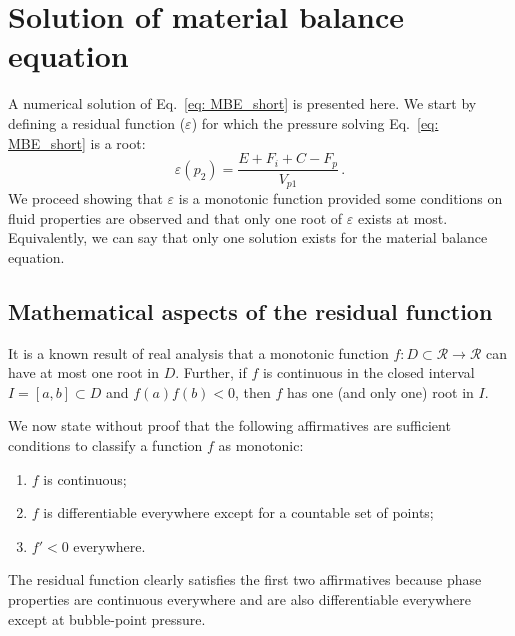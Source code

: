 \documentclass[final,authoryear,5p,twocolumn,10pt]{elsarticle}
\begin{document}

\section{Solution of material balance equation}
A numerical solution of Eq.~\eqref{eq: MBE_short} is presented here. We start by defining a residual function ($\varepsilon$) for which the pressure solving Eq.~\eqref{eq: MBE_short} is a root:
\begin{equation}\label{eq: residual}
\varepsilon(p_2) = \frac{E+F_i+C-F_p}{V_{p1}} \, .
\end{equation}
We proceed showing that $\varepsilon$ is a monotonic function provided some conditions on fluid properties are observed and that only one root of $\varepsilon$ exists at most. Equivalently, we can say that only one solution exists for the material balance equation.


\subsection{Mathematical aspects of the residual function}

It is a known result of real analysis that a monotonic function $f:D\subset\mathcal{R}\rightarrow\mathcal{R}$ can have at most one root in $D$. Further, if $f$ is continuous in the closed interval $I=[a,b] \subset D$ and $f(a)f(b)<0$, then $f$ has one (and only one) root in $I$.

We now state without proof that the following affirmatives are sufficient conditions to classify a function $f$ as monotonic:
\begin{enumerate}
\item $f$ is continuous;
\item $f$ is differentiable everywhere except for a countable set of points;
\item $f'<0$ everywhere.
\end{enumerate}

The residual function clearly satisfies the first two affirmatives because phase properties are continuous everywhere and are also differentiable everywhere except  at bubble-point pressure.
\end{document}
